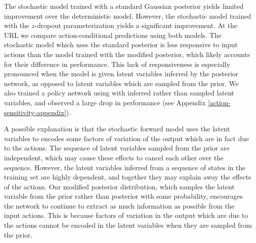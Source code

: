 \documentclass{article} %
\begin{document}
The stochastic model trained with a standard Gaussian posterior yields limited improvement over the deterministic model. 
However, the stochastic model trained with the $z$-dropout parameterization yields a significant improvement. 
At the URL we compare action-conditional predictions using both models.
The stochastic model which uses the standard posterior is less responsive to input actions than the model trained with the modified posterior, which likely accounts for their difference in performance. 
This lack of responsiveness is especially pronounced when the model is given latent variables inferred by the posterior network, as opposed to latent variables which are sampled from the prior.
We also trained a policy network using \modelnamedrop with inferred rather than sampled latent variables, and observed a large drop in performance (see Appendix \ref{action-sensitivity-appendix}).

A possible explanation is that the stochastic forward model uses the latent variables to encodes some factors of variation of the output which are in fact due to the actions.
The sequence of latent variables sampled from the prior are independent, which may cause these effects to cancel each other over the sequence. However, the latent variables inferred from a sequence of states in the training set are highly dependent, and together they may explain away the effects of the actions.
Our modified posterior distribution, which samples the latent variable from the prior rather than posterior with some probability, encourages the network to continue to extract as much information as possible from the input actions. This is because factors of variation in the output which are due to the actions cannot be encoded in the latent variables when they are sampled from the prior. 
\end{document}
